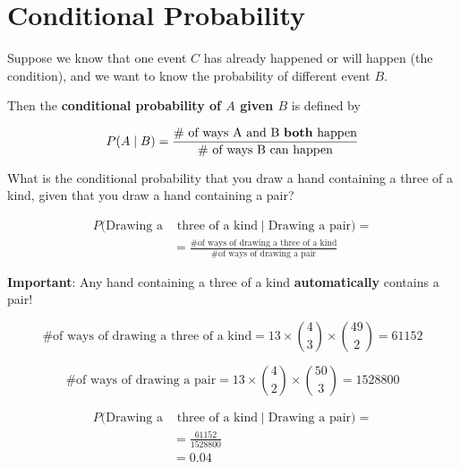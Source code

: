 \section{Conditional Probability}

%
\begin{frame}

Suppose we know that one event $C$ has already happened or will happen (the
condition), and we want to know the probability of different event $B$.

\hfill

Then the \textbf{conditional probability of $A$ given $B$} is defined by

$$ P(A \mid B) = \frac{\text{\# of ways A and B \textbf{both} happen}}{\text{\#
of ways B can happen}} $$

\end{frame}
%

%
\begin{frame}

What is the conditional probability that you draw a hand containing a three of a
kind, given that you draw a hand containing a pair?

\begin{align*}
P(\text{Drawing a} & \text{ three of a kind} \mid \text{Drawing a pair}) = \\ 
&= \frac{\text{\# of ways of drawing a three of a kind}}{\text{\# of ways of
drawing a pair}}
\end{align*}

\textbf{Important}: Any hand containing a three of a kind \textbf{automatically}
contains a pair!

\end{frame}
%

%
\begin{frame}

$$ \text{\# of ways of drawing a three of a kind} = 13 \times {{4}\choose{3}}
\times {{49}\choose{2}} = 61152 $$

$$ \text{\# of ways of drawing a pair} = 13 \times {{4}\choose{2}}
\times {{50}\choose{3}} = 1528800 $$

\end{frame}
%

%
\begin{frame}

\begin{align*}
P(\text{Drawing a} & \text{ three of a kind} \mid \text{Drawing a pair}) = \\ 
&= \frac{61152}{1528800} \\
&= 0.04
\end{align*}

\end{frame}
%

